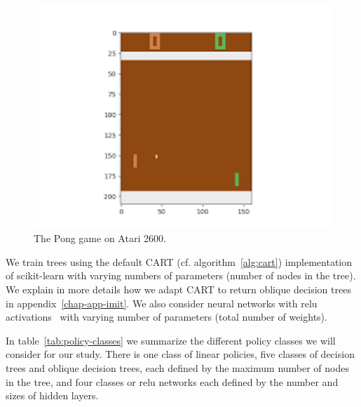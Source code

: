 \begin{figure}
\begin{minipage}{0.47\textwidth}
  \end{minipage}
  \hfill
  \begin{minipage}{0.47\textwidth}
  \includegraphics[width=1\textwidth]{images/images_part3/pong.png}
  \caption{The Pong game on Atari 2600.}\label{lst:generic-linear}
  \end{minipage}
  \end{figure}
We train trees using the default CART (cf. algorithm~\ref{alg:cart}) implementation of scikit-learn with varying numbers of parameters (number of nodes in the tree).
We explain in more details how we adapt CART to return oblique decision trees in appendix~\ref{chap-app-imit}.
We also consider neural networks with relu activations~\cite{relunet} with varying number of parameters (total number of weights).

In table~\ref{tab:policy-classes} we summarize the different policy classes we will consider for our study.
There is one class of linear policies, five classes of decision trees and oblique decision trees, each defined by the maximum number of nodes in the tree, and four classes or relu networks each defined by the number and sizes of hidden layers.


